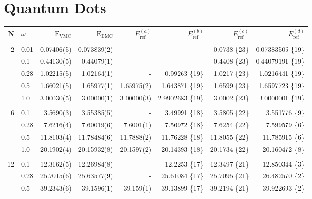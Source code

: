 \section{Quantum Dots}


\setlength{\tabcolsep}{5pt}
\begin{table}
\begin{center}
\begin{tabular}{rl|rrrrrr}
    N     & $\omega$ & $\mathrm{E_{VMC}}$ & $\mathrm{E_{DMC}}$ & $E_\mathrm{ref}^{(a)}$& $E_\mathrm{ref}^{(b)}$ & $E_\mathrm{ref}^{(c)}$ & $E_\mathrm{ref}^{(d)}$\\
\hline\hline
\multicolumn{8}{c}{} \\
    2     &   0.01   & 0.07406(5)  & 0.073839(2)  & -		& -			& 0.0738 \{23\} & 0.07383505 \{19\}\\
          &   0.1    & 0.44130(5)  & 0.44079(1)   & - 		& - 			& 0.4408 \{23\} & 0.44079191 \{19\}\\
          &   0.28   & 1.02215(5)  & 1.02164(1)   & -		&0.99263 \{19\} 	& 1.0217 \{23\}  & 1.0216441 \{19\}\\
          &   0.5    & 1.66021(5)  & 1.65977(1)   & 1.65975(2)&1.643871 \{19\}	& 1.6599 \{23\}  & 1.6597723 \{19\}\\
          &   1.0    & 3.00030(5)  & 3.00000(1)   & 3.00000(3)&2.9902683 \{19\}	& 3.0002 \{23\}  & 3.0000001 \{19\}\\
\cline{2-8}
\multicolumn{8}{c}{} \\
    6     &   0.1    &  3.5690(3)  &  3.55385(5)  & -		&3.49991 \{18\} 	& 3.5805 \{22\}  & 3.551776 \{9\}\\
          &   0.28   &  7.6216(4)  &  7.60019(6)  & 7.6001(1) &7.56972 \{18\} 	& 7.6254 \{22\}  & 7.599579 \{6\}\\
          &   0.5    & 11.8103(4)  & 11.78484(6)  & 11.7888(2)&11.76228 \{18\}	& 11.8055 \{22\} & 11.785915 \{6\}\\
          &   1.0    & 20.1902(4)  & 20.15932(8)  & 20.1597(2)&20.14393 \{18\}	& 20.1734 \{22\} & 20.160472 \{8\}\\
\cline{2-8}
\multicolumn{8}{c}{} \\
    12    &   0.1    & 12.3162(5)  & 12.26984(8)  & - 		&12.2253 \{17\} 	& 12.3497 \{21\} & 12.850344 \{3\}\\
          &   0.28   & 25.7015(6)  & 25.63577(9)  & - 		&25.61084 \{17\} 	& 25.7095 \{21\} & 26.482570 \{2\}\\
          &   0.5    & 39.2343(6)  & 39.1596(1)   & 39.159(1) &39.13899 \{17\}	& 39.2194 \{21\} & 39.922693 \{2\}\\

\end{tabular}
\end{center}
\end{table}
